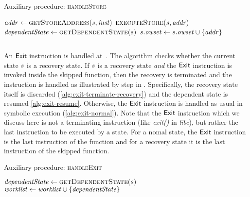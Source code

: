 \begin{algorithm}
  \caption{Auxiliary procedure: \textsc{handleStore}
  \label{fig:aux-handle-store}}
\begin{algorithmic}[1]

\State $\addr \gets \Call{getStoreAddress}{\workstate, \inst}$
\State $\Call{executeStore}{\workstate,\addr}$ \label{alg:store-normal}
 \label{alg:store-check-recovery}
  \State $\dependentState \gets \Call{getDependentState}{\workstate}$
  \State {} \label{alg:store-udpate-dep-states}
\Else
  \State $s.\mathit{owset} \gets s.\mathit{owset} \cup \{\mathit{addr}\}$ \label{alg:record-overwrite}
\EndIf
\EndFunction
\end{algorithmic}
\end{algorithm}

\subsection{}
An $\mathsf{Exit}$ instruction is handled at~.
The algorithm checks whether the current state $s$ is a
recovery state. If $s$ is a recovery state \emph{and} the
$\mathsf{Exit}$ instruction is invoked inside the skipped function,
then the recovery is terminated and the instruction is handled as
illustrated by step  in .
Specifically, the recovery state itself is discarded (\cref{alg:exit-terminate-recovery})
and the dependent state is resumed \cref{alg:exit-resume}.
Otherwise, the $\mathsf{Exit}$ instruction is handled as usual in symbolic execution (\cref{alg:exit-normal}).
Note that the $\mathsf{Exit}$ instruction which we discuss here
is not a terminating instruction (like \textit{exit()} in \textit{libc}),
but rather the last instruction to be executed by a state.
For a nomal state, the $\mathsf{Exit}$ instruction is the last instruction of the  function
and for a recovery state it is the last instruction of the skipped function.

\begin{algorithm}
  \caption{Auxiliary procedure: \textsc{handleExit}
  \label{fig:aux-handle-exit}}
\begin{algorithmic}[1]

 \label{alg:exit-check-recovery}
  \State {} \label{alg:exit-terminate-recovery}
  \State $\dependentState \gets  \Call{getDependentState}{\workstate}$ \label{alg:exit-extract-dependent}
  \State {} \label{alg:exit-resume}
  \State $\mathit{worklist} \gets  \mathit{worklist} \cup \{\mathit{dependentState}\}$
\Else
  \State {}  \label{alg:exit-normal}
  \label{alg:push-worklist-exit}
\EndIf
\EndFunction
\end{algorithmic}
\end{algorithm}

